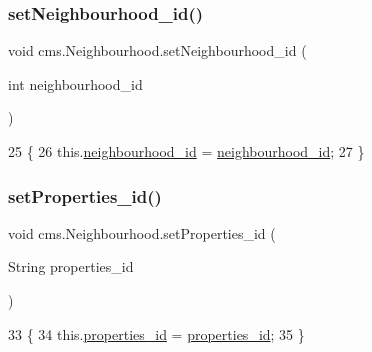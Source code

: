 \subsubsection{\texorpdfstring{set\+Neighbourhood\+\_\+id()}{setNeighbourhood\_id()}}
{\footnotesize\ttfamily void cms.\+Neighbourhood.\+set\+Neighbourhood\+\_\+id (\begin{DoxyParamCaption}\item[{int}]{neighbourhood\+\_\+id }\end{DoxyParamCaption})\hspace{0.3cm}{\ttfamily [inline]}}


\begin{DoxyCode}
25                                                           \{
26         this.\mbox{\hyperlink{classcms_1_1_neighbourhood_a8c177196de739fc0f3f68c3865c6fabf}{neighbourhood\_id}} = \mbox{\hyperlink{classcms_1_1_neighbourhood_a8c177196de739fc0f3f68c3865c6fabf}{neighbourhood\_id}};
27     \}
\end{DoxyCode}
\mbox{\label{classcms_1_1_neighbourhood_add4d2c1d9a99196c916503c8f7c5b509}} 
\subsubsection{\texorpdfstring{set\+Properties\+\_\+id()}{setProperties\_id()}}
{\footnotesize\ttfamily void cms.\+Neighbourhood.\+set\+Properties\+\_\+id (\begin{DoxyParamCaption}\item[{String}]{properties\+\_\+id }\end{DoxyParamCaption})\hspace{0.3cm}{\ttfamily [inline]}}


\begin{DoxyCode}
33                                                        \{
34         this.\mbox{\hyperlink{classcms_1_1_neighbourhood_a0264ef7dc2043131f27221feca29d254}{properties\_id}} = \mbox{\hyperlink{classcms_1_1_neighbourhood_a0264ef7dc2043131f27221feca29d254}{properties\_id}};
35     \}
\end{DoxyCode}
\mbox{\label{classcms_1_1_neighbourhood_a48841e05711991f412c2a28cb541a9be}} 
